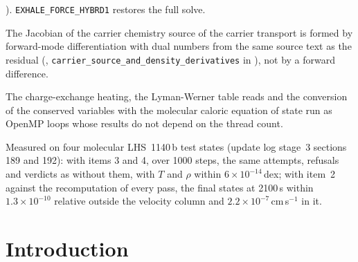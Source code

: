 \documentclass[english,a4paper]{my_memo}
\begin{document}
{\begin{description}
  ). \texttt{EXHALE\_FORCE\_HYBRD1} restores the full
  solve.
\item[4. Exact derivatives of the carrier chemistry.] The Jacobian of the
  carrier chemistry source of the carrier transport is formed by
  forward-mode differentiation with dual numbers from the same source text as
  the residual (,
  \texttt{carrier\_source\_and\_density\_derivatives} in
  ), not by a forward difference.
\item[5. Further parallel cell loops.] The charge-exchange heating, the
  Lyman-Werner table reads and the conversion of the conserved variables with
  the molecular caloric equation of state run as OpenMP loops whose results do
  not depend on the thread count.
\end{description}\par}
Measured on four molecular LHS~1140\,b test states (update log stage~3
sections 189 and 192): with items 3 and 4, over 1000 steps, the same
attempts, refusals and verdicts as without them, with $T$ and $\rho$ within
$6\times10^{-14}$\,dex; with item~2 against the recomputation of every pass,
the final states at 2100\,s within $1.3\times10^{-10}$ relative outside the
velocity column and $2.2\times10^{-7}$\,cm\,s$^{-1}$ in it.

\section{Introduction}
\end{document}
